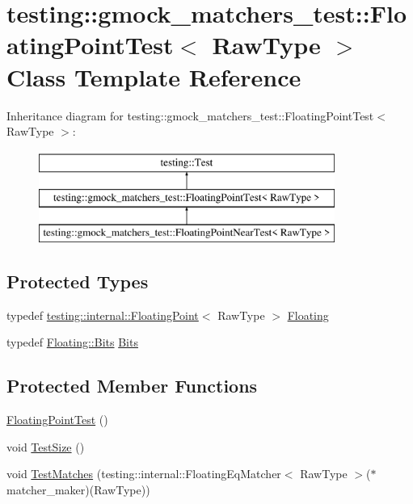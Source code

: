 \hypertarget{classtesting_1_1gmock__matchers__test_1_1FloatingPointTest}{}\section{testing\+::gmock\+\_\+matchers\+\_\+test\+::Floating\+Point\+Test$<$ Raw\+Type $>$ Class Template Reference}
\label{classtesting_1_1gmock__matchers__test_1_1FloatingPointTest}
Inheritance diagram for testing\+::gmock\+\_\+matchers\+\_\+test\+::Floating\+Point\+Test$<$ Raw\+Type $>$\+:\begin{figure}[H]
\begin{center}
\leavevmode
\includegraphics[height=3.000000cm]{classtesting_1_1gmock__matchers__test_1_1FloatingPointTest}
\end{center}
\end{figure}
\subsection*{Protected Types}
\begin{DoxyCompactItemize}
\item 
typedef \mbox{\hyperlink{classtesting_1_1internal_1_1FloatingPoint}{testing\+::internal\+::\+Floating\+Point}}$<$ Raw\+Type $>$ \mbox{\hyperlink{classtesting_1_1gmock__matchers__test_1_1FloatingPointTest_ae1459f93e1b18426625daf4fa98e80c6}{Floating}}
\item 
typedef \mbox{\hyperlink{classtesting_1_1internal_1_1FloatingPoint_abf228bf6cd48f12c8b44c85b4971a731}{Floating\+::\+Bits}} \mbox{\hyperlink{classtesting_1_1gmock__matchers__test_1_1FloatingPointTest_addf899bd832ae51103198d201d2f2ea2}{Bits}}
\end{DoxyCompactItemize}
\subsection*{Protected Member Functions}
\begin{DoxyCompactItemize}
\item 
\mbox{\hyperlink{classtesting_1_1gmock__matchers__test_1_1FloatingPointTest_af2fb52db3abf63903d78541c4c3a17d3}{Floating\+Point\+Test}} ()
\item 
void \mbox{\hyperlink{classtesting_1_1gmock__matchers__test_1_1FloatingPointTest_ad6f8f0f5c939b7447a5717620b728018}{Test\+Size}} ()
\item 
void \mbox{\hyperlink{classtesting_1_1gmock__matchers__test_1_1FloatingPointTest_a69d14d66bbd82f6b8bbe985046b59538}{Test\+Matches}} (testing\+::internal\+::\+Floating\+Eq\+Matcher$<$ Raw\+Type $>$($\ast$matcher\+\_\+maker)(Raw\+Type))
\end{DoxyCompactItemize}
